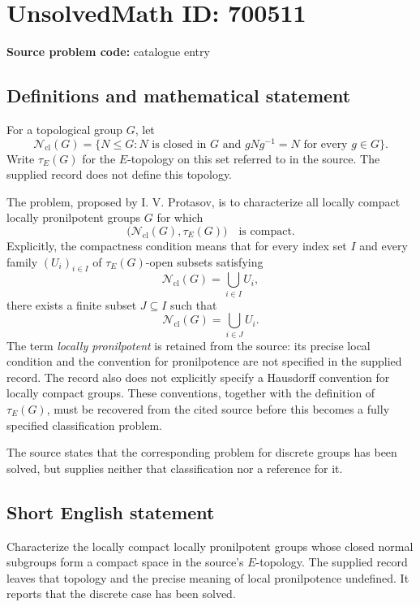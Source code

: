 \documentclass[11pt]{article}
\begin{document}
\section*{UnsolvedMath ID: 700511}
\textbf{Source problem code:} catalogue entry
\subsection{Definitions and mathematical statement}
For a topological group \(G\), let
\[
\mathcal N_{\mathrm{cl}}(G)=\{N\leq G:N\text{ is closed in }G\text{ and }gNg^{-1}=N\text{ for every }g\in G\}.
\]
Write \(\tau_E(G)\) for the \(E\)-topology on this set referred to in the source. The supplied record does not define this topology.

The problem, proposed by I. V. Protasov, is to characterize all locally compact locally pronilpotent groups \(G\) for which
\[
\bigl(\mathcal N_{\mathrm{cl}}(G),\tau_E(G)\bigr)
\quad\text{is compact}.
\]
Explicitly, the compactness condition means that for every index set \(I\) and every family \((U_i)_{i\in I}\) of \(\tau_E(G)\)-open subsets satisfying
\[
\mathcal N_{\mathrm{cl}}(G)=\bigcup_{i\in I}U_i,
\]
there exists a finite subset \(J\subseteq I\) such that
\[
\mathcal N_{\mathrm{cl}}(G)=\bigcup_{i\in J}U_i.
\]
The term \emph{locally pronilpotent} is retained from the source: its precise local condition and the convention for pronilpotence are not specified in the supplied record. The record also does not explicitly specify a Hausdorff convention for locally compact groups. These conventions, together with the definition of \(\tau_E(G)\), must be recovered from the cited source before this becomes a fully specified classification problem.

The source states that the corresponding problem for discrete groups has been solved, but supplies neither that classification nor a reference for it.
\subsection{Short English statement}
Characterize the locally compact locally pronilpotent groups whose closed normal subgroups form a compact space in the source's \(E\)-topology. The supplied record leaves that topology and the precise meaning of local pronilpotence undefined. It reports that the discrete case has been solved.
\end{document}
